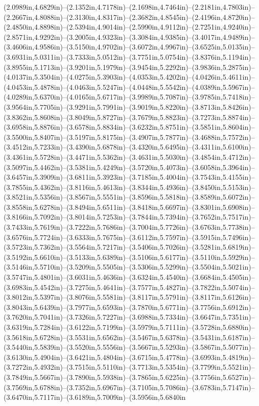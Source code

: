 (2.0989in,4.6829in)--(2.1352in,4.7178in)--(2.1698in,4.7464in)--(2.2181in,4.7803in)--(2.2667in,4.8088in)--(2.3130in,4.8317in)--(2.3682in,4.8545in)--(2.4196in,4.8720in)--(2.4850in,4.8898in)--(2.5394in,4.9014in)--(2.5990in,4.9112in)--(2.7251in,4.9240in)--(2.8571in,4.9292in)--(3.2005in,4.9323in)--(3.3084in,4.9385in)--(3.4017in,4.9489in)--(3.4606in,4.9586in)--(3.5150in,4.9702in)--(3.6072in,4.9967in)--(3.6525in,5.0135in)--(3.6931in,5.0311in)--(3.7333in,5.0512in)--(3.7751in,5.0754in)--(3.8376in,5.1194in)--(3.8955in,5.1713in)--(3.9201in,5.1979in)--(3.9454in,5.2292in)--(3.9836in,5.2875in)--(4.0137in,5.3504in)--(4.0275in,5.3903in)--(4.0353in,5.4202in)--(4.0426in,5.4611in)--(4.0453in,5.4878in)--(4.0463in,5.5247in)--(4.0448in,5.5542in)--(4.0389in,5.5967in)--(4.0289in,5.6370in)--(4.0165in,5.6717in)--(3.9989in,5.7087in)--(3.9785in,5.7418in)--(3.9564in,5.7705in)--(3.9291in,5.7991in)--(3.9019in,5.8220in)--(3.8713in,5.8426in)--(3.8362in,5.8608in)--(3.8049in,5.8727in)--(3.7679in,5.8823in)--(3.7273in,5.8874in)--(3.6958in,5.8876in)--(3.6578in,5.8834in)--(3.6232in,5.8751in)--(3.5851in,5.8604in)--(3.5500in,5.8407in)--(3.5197in,5.8175in)--(3.4907in,5.7877in)--(3.4688in,5.7572in)--(3.4512in,5.7233in)--(3.4390in,5.6878in)--(3.4320in,5.6495in)--(3.4311in,5.6100in)--(3.4361in,5.5728in)--(3.4471in,5.5362in)--(3.4631in,5.5030in)--(3.4854in,5.4712in)--(3.5097in,5.4462in)--(3.5381in,5.4249in)--(3.5720in,5.4073in)--(3.6058in,5.3964in)--(3.6457in,5.3909in)--(3.6811in,5.3923in)--(3.7185in,5.4004in)--(3.7543in,5.4155in)--(3.7855in,5.4362in)--(3.8116in,5.4613in)--(3.8344in,5.4936in)--(3.8450in,5.5153in)--(3.8521in,5.5356in)--(3.8567in,5.5551in)--(3.8596in,5.5818in)--(3.8589in,5.6072in)--(3.8558in,5.6278in)--(3.8494in,5.6511in)--(3.8418in,5.6697in)--(3.8301in,5.6908in)--(3.8166in,5.7092in)--(3.8014in,5.7253in)--(3.7844in,5.7394in)--(3.7652in,5.7517in)--(3.7433in,5.7619in)--(3.7222in,5.7686in)--(3.7004in,5.7726in)--(3.6763in,5.7738in)--(3.6576in,5.7724in)--(3.6333in,5.7675in)--(3.6112in,5.7597in)--(3.5915in,5.7496in)--(3.5723in,5.7362in)--(3.5564in,5.7217in)--(3.5406in,5.7026in)--(3.5281in,5.6819in)--(3.5192in,5.6610in)--(3.5133in,5.6389in)--(3.5106in,5.6177in)--(3.5110in,5.5929in)--(3.5146in,5.5710in)--(3.5209in,5.5505in)--(3.5306in,5.5299in)--(3.5504in,5.5021in)--(3.5747in,5.4801in)--(3.6031in,5.4636in)--(3.6324in,5.4540in)--(3.6684in,5.4505in)--(3.6983in,5.4542in)--(3.7275in,5.4641in)--(3.7577in,5.4827in)--(3.7822in,5.5074in)--(3.8012in,5.5397in)--(3.8076in,5.5581in)--(3.8117in,5.5791in)--(3.8117in,5.6126in)--(3.8043in,5.6439in)--(3.7977in,5.6593in)--(3.7870in,5.6771in)--(3.7756in,5.6912in)--(3.7620in,5.7041in)--(3.7326in,5.7227in)--(3.6988in,5.7334in)--(3.6647in,5.7351in)--(3.6319in,5.7284in)--(3.6122in,5.7199in)--(3.5979in,5.7111in)--(3.5728in,5.6880in)--(3.5618in,5.6728in)--(3.5531in,5.6562in)--(3.5467in,5.6378in)--(3.5431in,5.6187in)--(3.5440in,5.5839in)--(3.5520in,5.5556in)--(3.5667in,5.5293in)--(3.5867in,5.5077in)--(3.6130in,5.4904in)--(3.6421in,5.4804in)--(3.6715in,5.4778in)--(3.6993in,5.4819in)--(3.7272in,5.4932in)--(3.7515in,5.5110in)--(3.7713in,5.5354in)--(3.7799in,5.5521in)--(3.7849in,5.5667in)--(3.7890in,5.5938in)--(3.7865in,5.6225in)--(3.7756in,5.6527in)--(3.7569in,5.6788in)--(3.7352in,5.6967in)--(3.7105in,5.7086in)--(3.6783in,5.7147in)--(3.6470in,5.7117in)--(3.6189in,5.7009in)--(3.5956in,5.6840in